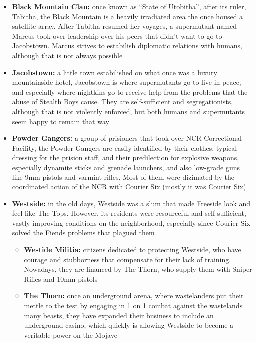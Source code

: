 \documentclass[11pt]{article} %
\begin{document}
\begin{itemize}
\item \textbf{Black Mountain Clan:} once known as ``State of Utobitha'', after its ruler, Tabitha, the Black Mountain is a heavily irradiated area the once housed a satellite array. After Tabitha resumed her voyages, a supermutant named Marcus took over leadership over his peers that didn't want to go to Jacobstown. Marcus strives to estabilish diplomatic relations with humans, although that is not always possible

\item \textbf{Jacobstown:} a little town estabilished on what once was a luxury mountainside hotel, Jacobstown is where supermutants go to live in peace, and especially where nightkins go to receive help from the problems that the abuse of Stealth Boys cause. They are self-sufficient and segregationists, although that is not violently enforced, but both humans and supermutants seem happy to remain that way

\item \textbf{Powder Gangers:} a group of prisioners that took over NCR Correctional Facility, the Powder Gangers are easily identified by their clothes, typical dressing for the prision staff, and their predilection for explosive weapons, especially dynamite sticks and grenade launchers, and also low-grade guns like 9mm pistols and varmint rifles. Most of them were dizimated by the coordinated action of the NCR with Courier Six (mostly it was Courier Six)
	
\item \textbf{Westside:} in the old days, Westside was a slum that made Freeside look and feel like The Tops. However, its residents were resourceful and self-sufficient, vastly improving conditions on the neighborhood, especially since Courier Six solved the Fiends problems that plagued them
	\begin{itemize}
	\item \textbf{Westide Militia:} citizens dedicated to protecting Westside, who have courage and stubborness that compensate for their lack of training. Nowadays, they are financed by The Thorn, who supply them with Sniper Rifles and 10mm pistols
	
	\item \textbf{The Thorn:} once an underground arena, where wastelanders put their mettle to the test by engaging in 1 on 1 combat against the wastelands many beasts, they have expanded their business to include an underground casino, which quickly is allowing Westside to become a veritable power on the Mojave
	\end{itemize} 


\end{itemize}
\end{document}
